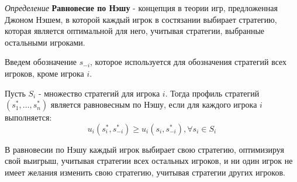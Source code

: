 \textit{Определение} \textbf{Равновесие по Нэшу} - концепция в теории игр, предложенная Джоном Нэшем, в которой каждый игрок в состязании выбирает стратегию, которая является оптимальной для него, учитывая стратегии, выбранные остальными игроками. \cite{nash1950non}

Введем обозначение \(s_{-i}\), которое используется для обозначения стратегий всех игроков, кроме игрока $i$. 

Пусть \(S_i\) - множество стратегий для игрока \(i\). Тогда профиль стратегий $(s_1^{*}, \dots,s_n^{*})$ является равновесным по Нэшу, если для каждого игрока $i$ выполняется:
$$
    u_i(s_i^{*},s_{-i}^{*}) \ge u_i(s_i,s_{-i}^{*}), \forall s_i \in S_i
$$

В равновесии по Нэшу каждый игрок выбирает свою стратегию, оптимизируя свой выигрыш, учитывая стратегии всех остальных игроков, и ни один игрок не имеет желания изменить свою стратегию, учитывая стратегии других игроков.
